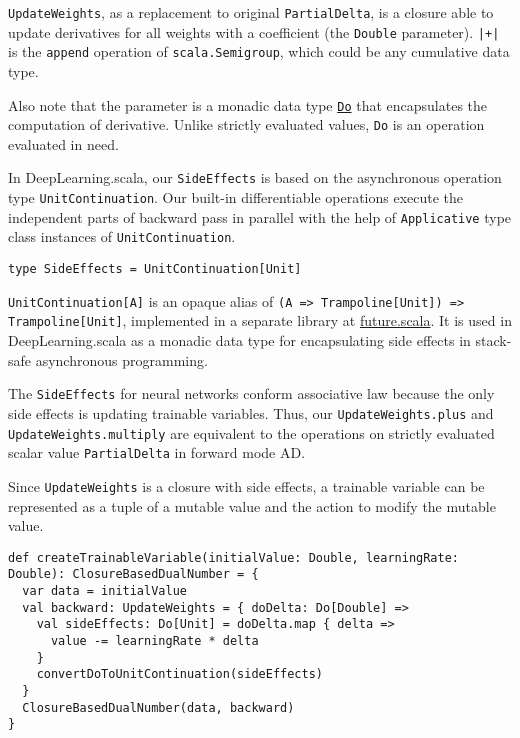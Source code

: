 \lstinline{UpdateWeights}, as a replacement to original \lstinline{PartialDelta}, is a closure able to update derivatives for all weights with a coefficient (the \lstinline{Double} parameter).
\lstinline{|+|} is the \lstinline{append} operation of \lstinline{scala.Semigroup}, which could be any cumulative data type.

Also note that the parameter is a monadic data type \href{https://javadoc.io/page/com.thoughtworks.raii/asynchronous_2.11/latest/com/thoughtworks/raii/asynchronous%24%24Do.html}{\lstinline{Do}} that encapsulates the computation of derivative. Unlike strictly evaluated values, \lstinline{Do} is an operation evaluated in need.

In DeepLearning.scala, our \lstinline{SideEffects} is based on the asynchronous operation type \texttt{UnitContinuation}. Our built-in differentiable operations execute the independent parts of backward pass in parallel with the help of \lstinline{Applicative} type class instances of \texttt{UnitContinuation}.

\begin{lstlisting}[float={h t b p},caption={Monadic side-effects}, label={SideEffects}]
type SideEffects = UnitContinuation[Unit]
\end{lstlisting}

\lstinline{UnitContinuation[A]} is an opaque alias \cite{erik2017opaque} of \lstinline{(A => Trampoline[Unit]) => Trampoline[Unit]}, implemented in a separate library at \href{https://github.com/ThoughtWorksInc/future.scala}{future.scala}. It is used in DeepLearning.scala as a monadic data type for encapsulating side effects in stack-safe asynchronous programming.

The \lstinline{SideEffects} for neural networks conform associative law because the only side effects is updating \glspl{trainable variable}. Thus, our \lstinline{UpdateWeights.plus} and \lstinline{UpdateWeights.multiply} are equivalent to the operations on strictly evaluated scalar value \lstinline{PartialDelta} in forward mode AD.

Since \lstinline{UpdateWeights} is a closure with side effects, a \gls{trainable variable} can be represented as a tuple of a mutable value and the action to modify the mutable value.

\begin{lstlisting}[float={h t b p},caption={Create a dual number for a \gls{trainable variable}}, label={createTrainableVariable}]
def createTrainableVariable(initialValue: Double, learningRate: Double): ClosureBasedDualNumber = {
  var data = initialValue
  val backward: UpdateWeights = { doDelta: Do[Double] =>
    val sideEffects: Do[Unit] = doDelta.map { delta =>
      value -= learningRate * delta
    }
    convertDoToUnitContinuation(sideEffects)
  }
  ClosureBasedDualNumber(data, backward)
}
\end{lstlisting}

